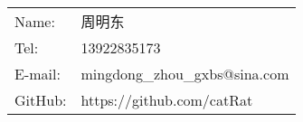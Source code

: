\begin{tabular}{ll}
  Name: & 周明东 \\
  Tel: & 13922835173 \\
  E-mail: & mingdong\_zhou\_gxbs@sina.com \\
  GitHub: & https://github.com/catRat
\end{tabular}
